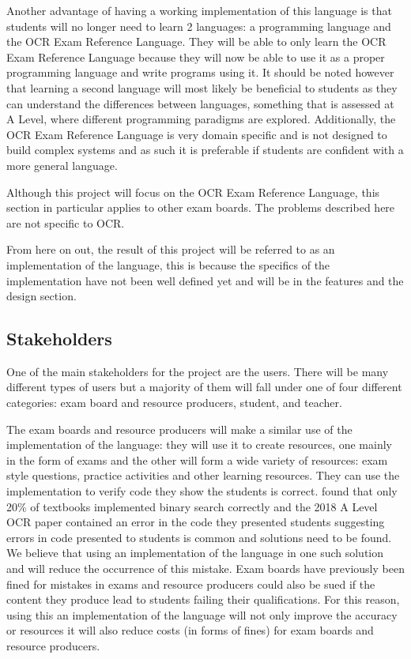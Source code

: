 \documentclass{article}
\begin{document}
Another advantage of having a working implementation of this language is that
students will no longer need to learn 2 languages: a programming language and
the OCR Exam Reference Language. They will be able to only learn the OCR Exam
Reference Language because they will now be able to use it as a proper
programming language and write programs using it. It should be noted however
that learning a second language will most likely be beneficial to students as
they can understand the differences between languages, something that is
assessed at A Level, where different programming paradigms are explored.
Additionally, the OCR Exam Reference Language is very domain specific and is
not designed to build complex systems and as such it is preferable if students
are confident with a more general language.

Although this project will focus on the OCR Exam Reference Language, this
section in particular applies to other exam boards. The problems described here
are not specific to OCR.


From here on out, the result of this project will be referred to as an
implementation of the language, this is because the specifics of the
implementation have not been well defined yet and will be in the features and
the design section.

\subsection{Stakeholders}

One of the main stakeholders for the project are the users. There will be
many different types of users but a majority of them will fall under one of
four different categories: exam board and resource producers, student, and
teacher.

The exam boards and resource producers will make a similar use of the
implementation of the language: they will use it to create resources, one
mainly in the form of exams and the other will form a wide variety of
resources: exam style questions, practice activities and other learning
resources. They can use the implementation to verify code they show the
students is correct. \Textcite{pattis88} found that only 20\% of textbooks
implemented binary search correctly and the 2018 A Level OCR paper contained an
error in the code they presented students suggesting errors in code presented
to students is common and solutions need to be found. We believe that using
an implementation of the language in one such solution and will reduce the
occurrence of this mistake. Exam boards have previously been fined for mistakes
in exams \cite{ofqual20180702} and resource producers could also be sued if the
content they produce lead to students failing their qualifications. For this
reason, using this an implementation of the language will not only improve the
accuracy or resources it will also reduce costs (in forms of fines) for exam
boards and resource producers.
\end{document}
